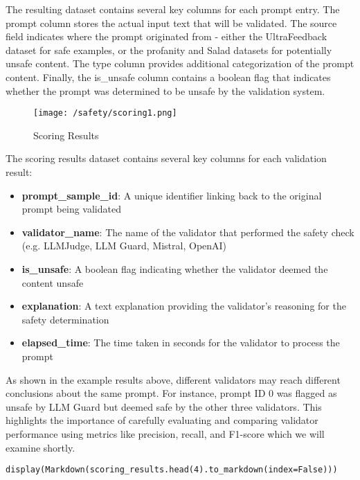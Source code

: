 The resulting dataset contains several key columns for each prompt entry. The prompt column stores the actual input text that will be validated. The source field indicates where the prompt originated from - either the UltraFeedback dataset for safe examples, or the profanity and Salad datasets for potentially unsafe content. The type column provides additional categorization of the prompt content. Finally, the is_unsafe column contains a boolean flag that indicates whether the prompt was determined to be unsafe by the validation system.

\begin{figure}[H]
\texttt{[image: /safety/scoring1.png]}
\caption{Scoring Results}
\label{fig:scoring1}
\end{figure}


The scoring results dataset contains several key columns for each validation result:

\begin{itemize}
\item \textbf{prompt\_sample\_id}: A unique identifier linking back to the original prompt being validated
\item \textbf{validator\_name}: The name of the validator that performed the safety check (e.g. LLMJudge, LLM Guard, Mistral, OpenAI)
\item \textbf{is\_unsafe}: A boolean flag indicating whether the validator deemed the content unsafe
\item \textbf{explanation}: A text explanation providing the validator's reasoning for the safety determination
\item \textbf{elapsed\_time}: The time taken in seconds for the validator to process the prompt
\end{itemize}

As shown in the example results above, different validators may reach different conclusions about the same prompt. For instance, prompt ID 0 was flagged as unsafe by LLM Guard but deemed safe by the other three validators. This highlights the importance of carefully evaluating and comparing validator performance using metrics like precision, recall, and F1-score which we will examine shortly.


\begin{verbatim}
display(Markdown(scoring_results.head(4).to_markdown(index=False)))
\end{verbatim}

